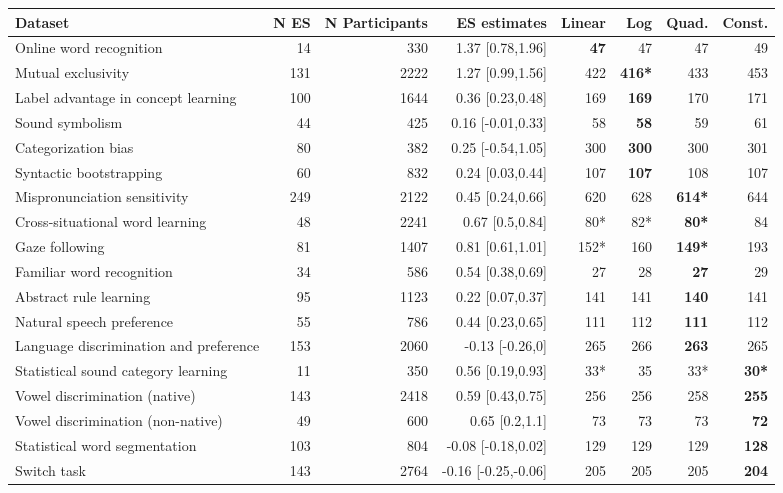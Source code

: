 \documentclass[10pt, letterpaper]{article}
\begin{document}
\begin{table}[ht]
\begin{tabular}{l|r|r|r|r|r|r|r}

\hline
\textbf{Dataset} & N ES & N Participants & ES estimates & Linear & Log & Quad. & Const.\\
\hline
Online word recognition & 14 & 330 & 1.37 [0.78,1.96] & \textbf{47} & 47 & 47 & 49\\
Mutual exclusivity & 131 & 2222 & 1.27 [0.99,1.56] & 422 & \textbf{416*} & 433 & 453\\
Label advantage in concept learning & 100 & 1644 & 0.36 [0.23,0.48] & 169 & \textbf{169} & 170 & 171\\
Sound symbolism & 44 & 425 & 0.16 [-0.01,0.33] & 58 & \textbf{58} & 59 & 61\\
Categorization bias & 80 & 382 & 0.25 [-0.54,1.05] & 300 & \textbf{300} & 300 & 301\\
Syntactic bootstrapping & 60 & 832 & 0.24 [0.03,0.44] & 107 & \textbf{107} & 108 & 107\\
Mispronunciation sensitivity & 249 & 2122 & 0.45 [0.24,0.66] & 620 & 628 & \textbf{614*} & 644\\
Cross-situational word learning & 48 & 2241 & 0.67 [0.5,0.84] & 80* & 82* & \textbf{80*} & 84\\
Gaze following & 81 & 1407 & 0.81 [0.61,1.01] & 152* & 160 & \textbf{149*} & 193\\
Familiar word recognition & 34 & 586 & 0.54 [0.38,0.69] & 27 & 28 & \textbf{27} & 29\\
Abstract rule learning & 95 & 1123 & 0.22 [0.07,0.37] & 141 & 141 & \textbf{140} & 141\\
Natural speech preference & 55 & 786 & 0.44 [0.23,0.65] & 111 & 112 & \textbf{111} & 112\\
Language discrimination and preference & 153 & 2060 & -0.13 [-0.26,0] & 265 & 266 & \textbf{263} & 265\\
Statistical sound category learning & 11 & 350 & 0.56 [0.19,0.93]& 33* & 35 & 33* & \textbf{30*}\\
Vowel discrimination (native) & 143 & 2418 & 0.59 [0.43,0.75] & 256 & 256 & 258 & \textbf{255}\\
Vowel discrimination (non-native) & 49 & 600 & 0.65 [0.2,1.1] & 73 & 73 & 73 & \textbf{72}\\
Statistical word segmentation & 103 & 804 & -0.08 [-0.18,0.02] & 129 & 129 & 129 & \textbf{128}\\
Switch task & 143 & 2764 & -0.16 [-0.25,-0.06] & 205 & 205 & 205 & \textbf{204}\\

\end{tabular}
\end{table}
\end{document}
